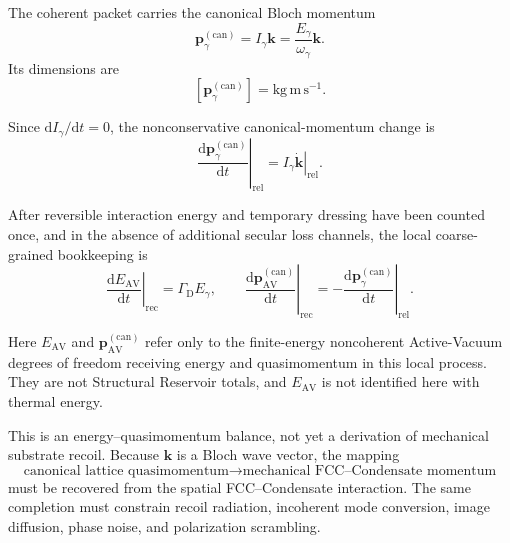 The coherent packet carries the canonical Bloch momentum
\begin{equation}
    \mathbf p_{\gamma}^{(\mathrm{can})}
    =
    I_\gamma\mathbf k
    =
    \frac{
        E_\gamma
    }{
        \omega_\gamma
    }
    \mathbf k.
    \label{eq:photon_relaxation_packet_momentum}
\end{equation}
Its dimensions are
\begin{equation}
    \left[
        \mathbf p_{\gamma}^{(\mathrm{can})}
    \right]
    =
    \mathrm{kg\,m\,s^{-1}}.
    \label{eq:photon_relaxation_packet_momentum_dimensions}
\end{equation}

Since
\(\mathrm dI_\gamma/\mathrm dt=0\),
the nonconservative canonical-momentum change is
\begin{equation}
    \left.
        \frac{
            \mathrm d
            \mathbf p_{\gamma}^{(\mathrm{can})}
        }{
            \mathrm dt
        }
    \right|_{\mathrm{rel}}
    =
    I_\gamma
    \left.
        \dot{\mathbf k}
    \right|_{\mathrm{rel}}.
    \label{eq:photon_relaxation_packet_momentum_loss}
\end{equation}

After reversible interaction energy and temporary dressing have been counted
once, and in the absence of additional secular loss channels, the local
coarse-grained bookkeeping is
\begin{equation}
    \left.
    \frac{
        \mathrm dE_{\mathrm{AV}}
    }{
        \mathrm dt
    }
    \right|_{\mathrm{rec}}
    =
    \Gamma_{\mathrm D}E_\gamma,
    \qquad
    \left.
        \frac{
            \mathrm d
            \mathbf p_{\mathrm{AV}}^{(\mathrm{can})}
        }{
            \mathrm dt
        }
    \right|_{\mathrm{rec}}
    =
    -
    \left.
        \frac{
            \mathrm d
            \mathbf p_{\gamma}^{(\mathrm{can})}
        }{
            \mathrm dt
        }
    \right|_{\mathrm{rel}}.
    \label{eq:photon_relaxation_reservoir_balance}
\end{equation}

Here \(E_{\mathrm{AV}}\) and
\(\mathbf p_{\mathrm{AV}}^{(\mathrm{can})}\) refer only to the
finite-energy noncoherent Active-Vacuum degrees of freedom receiving energy
and quasimomentum in this local process. They are not Structural Reservoir
totals, and \(E_{\mathrm{AV}}\) is not identified here with thermal energy.

This is an energy--quasimomentum balance, not yet a derivation of mechanical
substrate recoil. Because \(\mathbf k\) is a Bloch wave vector, the mapping
\begin{equation}
    \text{canonical lattice quasimomentum}
    \longrightarrow
    \text{mechanical FCC--Condensate momentum}
    \label{eq:photon_relaxation_quasimomentum_mechanical_mapping}
\end{equation}
must be recovered from the spatial FCC--Condensate interaction. The same
completion must constrain recoil radiation, incoherent mode conversion, image
diffusion, phase noise, and polarization scrambling.


